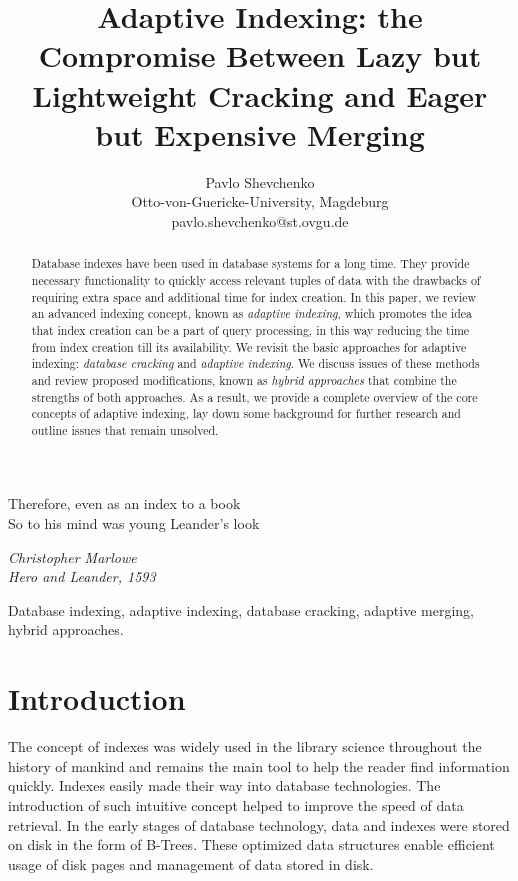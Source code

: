 \documentclass[10pt, conference, compsocconf]{IEEEtran}
\begin{document}
\title{Adaptive Indexing: the Compromise Between Lazy but Lightweight Cracking and Eager but Expensive Merging}
\author{Pavlo Shevchenko \\ Otto-von-Guericke-University, Magdeburg \\ pavlo.shevchenko@st.ovgu.de}

\maketitle

\epigraph{Therefore, even as an index to a book \\
So to his mind was young Leander's look}{\textit{Christopher Marlowe\\Hero and Leander, 1593}}

\begin{abstract}
Database indexes have been used in database systems for a long time. They provide necessary functionality to quickly access relevant tuples of data with the drawbacks of requiring extra space and additional time for index creation. In this paper, we review an advanced indexing concept, known as \emph{adaptive indexing}, which promotes the idea that index creation can be a part of query processing, in this way reducing the time from index creation till its availability. We revisit the basic approaches for adaptive indexing: \emph{database cracking} and \emph{adaptive indexing}. We discuss issues of these methods and review proposed modifications, known as \emph{hybrid approaches} that combine the strengths of both approaches. As a result, we provide a complete overview of the core concepts of adaptive indexing, lay down some background for further research and outline issues that remain unsolved.\\
\end{abstract}

\begin{IEEEkeywords}
Database indexing, adaptive indexing, database cracking, adaptive merging, hybrid approaches.
\end{IEEEkeywords}

\section{Introduction}
The concept of indexes was widely used in the library science throughout the history of mankind and remains the main tool to help the reader find information quickly. Indexes easily made their way into database technologies. The introduction of such intuitive concept helped to improve the speed of data retrieval. In the early stages of database technology, data and indexes were stored on disk in the form of B-Trees. These optimized data structures enable efficient usage of disk pages and management of data stored in disk.
\end{document}
